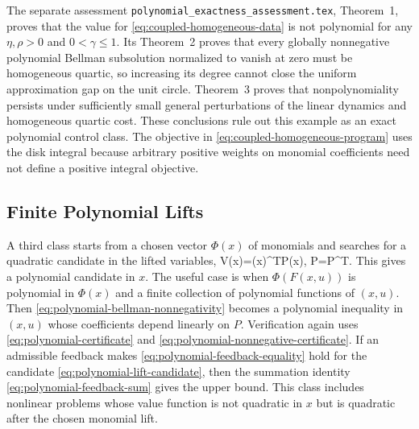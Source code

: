 \documentclass{article}
\begin{document}
The separate assessment \texttt{polynomial\_exactness\_assessment.tex}, Theorem~1, proves that the value for \eqref{eq:coupled-homogeneous-data} is not polynomial for any $\eta,\rho>0$ and $0<\gamma\leq1$. Its Theorem~2 proves that every globally nonnegative polynomial Bellman subsolution normalized to vanish at zero must be homogeneous quartic, so increasing its degree cannot close the uniform approximation gap on the unit circle. Theorem~3 proves that nonpolynomiality persists under sufficiently small general perturbations of the linear dynamics and homogeneous quartic cost. These conclusions rule out this example as an exact polynomial control class. The objective in \eqref{eq:coupled-homogeneous-program} uses the disk integral because arbitrary positive weights on monomial coefficients need not define a positive integral objective.

\subsection{Finite Polynomial Lifts}

A third class starts from a chosen vector $\Phi(x)$ of monomials and searches for a quadratic candidate in the lifted variables,
\BEQ
V(x)=\Phi(x)^TP\Phi(x),
\quad P=P^T.
\label{eq:polynomial-lift-candidate}
\EEQ
This gives a polynomial candidate in $x$. The useful case is when $\Phi(F(x,u))$ is polynomial in $\Phi(x)$ and a finite collection of polynomial functions of $(x,u)$. Then \eqref{eq:polynomial-bellman-nonnegativity} becomes a polynomial inequality in $(x,u)$ whose coefficients depend linearly on $P$. Verification again uses \eqref{eq:polynomial-certificate} and \eqref{eq:polynomial-nonnegative-certificate}. If an admissible feedback makes \eqref{eq:polynomial-feedback-equality} hold for the candidate \eqref{eq:polynomial-lift-candidate}, then the summation identity \eqref{eq:polynomial-feedback-sum} gives the upper bound. This class includes nonlinear problems whose value function is not quadratic in $x$ but is quadratic after the chosen monomial lift.
\end{document}
